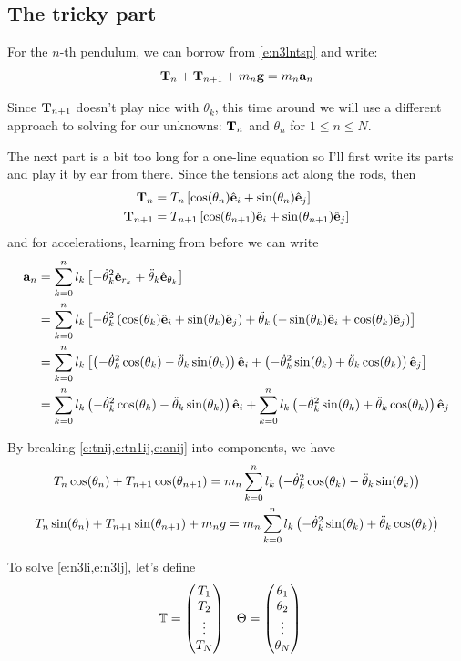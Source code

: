 \documentclass{article}
\begin{document}
\subsection{The tricky part}
For the $n$-th pendulum, we can borrow from \cref{e:n3lntsp} and write:
\begin{equation} 
 \mathbf{T}_{n}+\mathbf{T}_{n+1}+m_{n}\mathbf{g}=m_{n}\mathbf{a}_{n} 
\end{equation}

Since $\mathbf{T}_{n+1}$ doesn't play nice with $\theta_k$, this time around we will use a different approach to solving for our unknowns: $\mathbf{T}_{n}$ and $\ddot{\theta}_n$ for $1\le n\le N$.

The next part is a bit too long for a one-line equation so I'll first write its parts and play it by ear from there. Since the tensions act along the rods, then
\begin{align}
  \mathbf{T}_{n}&=T_{n}\left[\cos(\theta_n)\hat{\mathbf{e}}_i+\sin(\theta_n)\hat{\mathbf{e}}_j\right] \label{e:tnij}\\
  \mathbf{T}_{n+1}&=T_{n+1}\left[\cos(\theta_{n+1})\hat{\mathbf{e}}_i+\sin(\theta_{n+1})\hat{\mathbf{e}}_j\right] \label{e:tn1ij}
\end{align}
and for accelerations, learning from before we can write
\begin{align}
  \mathbf{a}_n&=\sum_{k=0}^{n}l_k\left[-\dot{\theta}_{k}^2\hat{\mathbf{e}}_{r_{k}}+\ddot{\theta}_{k}\hat{\mathbf{e}}_{\theta_{k}}\right]\notag\\
  &=\sum_{k=0}^{n}l_k\left[-\dot{\theta}_{k}^2\left(\cos(\theta_k)\hat{\mathbf{e}}_i+\sin(\theta_k)\hat{\mathbf{e}}_j\right)+\ddot{\theta}_{k}\left(-\sin(\theta_k)\hat{\mathbf{e}}_i+\cos(\theta_k)\hat{\mathbf{e}}_j\right)\right]\notag\\
  &=\sum_{k=0}^{n}l_k\left[\left(-\dot{\theta}_{k}^2\cos(\theta_k)-\ddot{\theta}_{k}\sin(\theta_k)\right)\hat{\mathbf{e}}_i+\left(-\dot{\theta}_{k}^2\sin(\theta_k)+\ddot{\theta}_{k}\cos(\theta_k)\right)\hat{\mathbf{e}}_j\right]\notag\\
  &=\sum_{k=0}^{n}l_k \left(-\dot{\theta}_{k}^2\cos(\theta_k)-\ddot{\theta}_{k}\sin(\theta_k)\right)\hat{\mathbf{e}}_i
  +
  \sum_{k=0}^{n}l_k \left(-\dot{\theta}_{k}^2\sin(\theta_k)+\ddot{\theta}_{k}\cos(\theta_k)\right)\hat{\mathbf{e}}_j \label{e:anij}
\end{align}

By breaking \cref{e:tnij,e:tn1ij,e:anij} into components, we have 
\begin{gather}
  T_{n}\cos(\theta_{n})+T_{n+1}\cos(\theta_{n+1})
  =
  m_n\sum_{k=0}^n l_k \left(-\dot{\theta}_{k}^2\cos(\theta_k)-\ddot{\theta}_{k}\sin(\theta_k)\right)
  \label{e:n3li}
  \\
  T_{n}\sin(\theta_{n})+T_{n+1}\sin(\theta_{n+1})+m_ng
  =
  m_n\sum_{k=0}^{n}l_k \left(-\dot{\theta}_{k}^2\sin(\theta_k)+\ddot{\theta}_{k}\cos(\theta_k)\right)
  \label{e:n3lj}
\end{gather}

To solve \cref{e:n3li,e:n3lj}, let's define
\begin{align}
\mathbb{T}&=
\begin{pmatrix}
  T_{1}\\
  T_{2}\\
  \vdots\\
  T_{N}
\end{pmatrix} 
& 
\Theta&=
\begin{pmatrix}
  \theta_1\\
  \theta_2\\
  \vdots\\
  \theta_N
\end{pmatrix}
\end{align}
\end{document}
